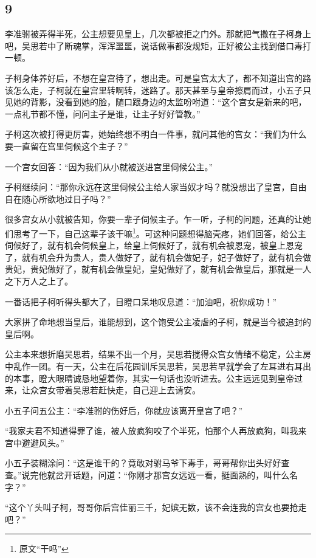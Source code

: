 {\centering\subsection{9}}

李准驸被弄得半死，公主想要见皇上，几次都被拒之门外。那就把气撒在子柯身上吧，吴思若中了断魂掌，浑浑噩噩，说话做事都没规矩，正好被公主找到借口毒打一顿。

子柯身体养好后，不想在皇宫待了，想出走。可是皇宫太大了，都不知道出宫的路该怎么走，子柯就在皇宫里转啊转，迷路了。那天甚至与皇帝擦肩而过，小五子只见她的背影，没看到她的脸，随口跟身边的太监吩咐道：“这个宫女是新来的吧，一点礼节都不懂，问问主子是谁，让主子好好管教。”

子柯这次被打得更厉害，她始终想不明白一件事，就问其他的宫女：“我们为什么要一直留在宫里伺候这个主子？”

一个宫女回答：“因为我们从小就被送进宫里伺候公主。”

子柯继续问：“那你永远在这里伺候公主给人家当奴才吗？就没想出了皇宫，自由自在随心所欲地过日子吗？”

很多宫女从小就被告知，你要一辈子伺候主子。乍一听，子柯的问题，还真的让她们思考了一下，自己这辈子该干嘛\footnote{原文“干吗”}。可这种问题想得脑壳疼，她们回答，给公主伺候好了，就有机会伺候皇上，给皇上伺候好了，就有机会被恩宠，被皇上恩宠了，就有机会升为贵人，贵人做好了，就有机会做妃子，妃子做好了，就有机会做贵妃，贵妃做好了，就有机会做皇妃，皇妃做好了，就有机会做皇后，那就是一人之下万人之上了。

一番话把子柯听得头都大了，目瞪口呆地叹息道：“加油吧，祝你成功！”

大家拼了命地想当皇后，谁能想到，这个饱受公主凌虐的子柯，就是当今被追封的皇后啊。
\newline

公主本来想折磨吴思若，结果不出一个月，吴思若搅得众宫女情绪不稳定，公主房中乱作一团。有一天，公主在后花园训斥吴思若，吴思若早就学会了左耳进右耳出的本事，瞪大眼睛诚恳地望着你，其实一句话也没听进去。公主远远见到皇帝过来，让众宫女带着吴思若赶快走，自己迎上去请安。

小五子问五公主：“李准驸的伤好后，你就应该离开皇宫了吧？”

“我家夫君不知道得罪了谁，被人放疯狗咬了个半死，怕那个人再放疯狗，叫我来宫中避避风头。”

小五子装糊涂问：“这是谁干的？竟敢对驸马爷下毒手，哥哥帮你出头好好查查。”说完他就岔开话题，问道：“你刚才那宫女远远一看，挺面熟的，叫什么名字？”

“这个丫头叫子柯，哥哥你后宫佳丽三千，妃嫔无数，该不会连我的宫女也要抢走吧？”

